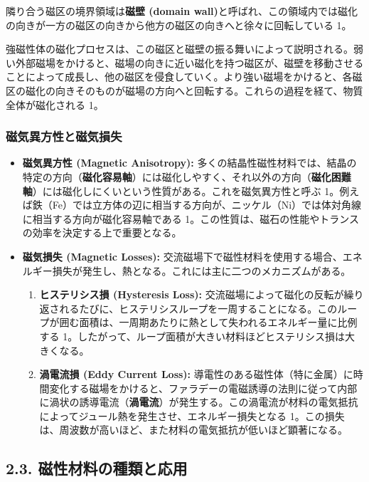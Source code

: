 \documentclass[11pt,a4paper]{ltjsarticle}
\begin{document}
隣り合う磁区の境界領域は\textbf{磁壁 (domain wall)}と呼ばれ、この領域内では磁化の向きが一方の磁区の向きから他方の磁区の向きへと徐々に回転している 1。

強磁性体の磁化プロセスは、この磁区と磁壁の振る舞いによって説明される。弱い外部磁場をかけると、磁場の向きに近い磁化を持つ磁区が、磁壁を移動させることによって成長し、他の磁区を侵食していく。より強い磁場をかけると、各磁区の磁化の向きそのものが磁場の方向へと回転する。これらの過程を経て、物質全体が磁化される 1。

\subsubsection*{磁気異方性と磁気損失}

\begin{itemize}
\item \textbf{磁気異方性 (Magnetic Anisotropy):} 多くの結晶性磁性材料では、結晶の特定の方向（\textbf{磁化容易軸}）には磁化しやすく、それ以外の方向（\textbf{磁化困難軸}）には磁化しにくいという性質がある。これを磁気異方性と呼ぶ 1。例えば鉄（Fe）では立方体の辺に相当する方向が、ニッケル（Ni）では体対角線に相当する方向が磁化容易軸である 1。この性質は、磁石の性能やトランスの効率を決定する上で重要となる。

\item \textbf{磁気損失 (Magnetic Losses):} 交流磁場下で磁性材料を使用する場合、エネルギー損失が発生し、熱となる。これには主に二つのメカニズムがある。
\begin{enumerate}
\item \textbf{ヒステリシス損 (Hysteresis Loss):} 交流磁場によって磁化の反転が繰り返されるたびに、ヒステリシスループを一周することになる。このループが囲む面積は、一周期あたりに熱として失われるエネルギー量に比例する 1。したがって、ループ面積が大きい材料ほどヒステリシス損は大きくなる。
\item \textbf{渦電流損 (Eddy Current Loss):} 導電性のある磁性体（特に金属）に時間変化する磁場をかけると、ファラデーの電磁誘導の法則に従って内部に渦状の誘導電流（\textbf{渦電流}）が発生する。この渦電流が材料の電気抵抗によってジュール熱を発生させ、エネルギー損失となる 1。この損失は、周波数が高いほど、また材料の電気抵抗が低いほど顕著になる。
\end{enumerate}
\end{itemize}

\subsection*{2.3. 磁性材料の種類と応用}
\end{document}
